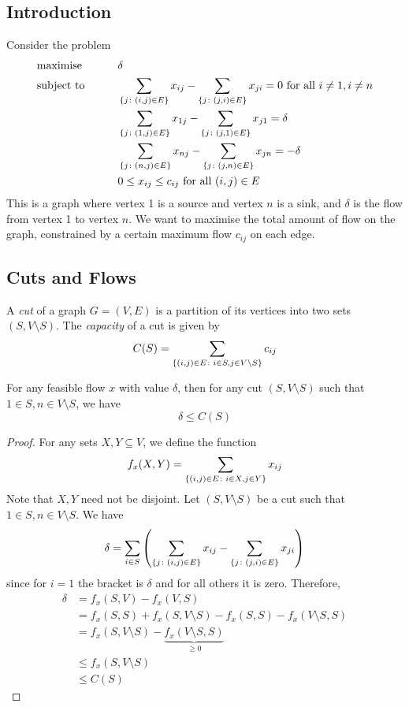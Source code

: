 \subsection{Introduction}
Consider the problem
\begin{alignat*}{2}
    & \text{maximise} & \qquad & \delta     \\
    & \text{subject to}                             &  & \sum_{\qty{j \colon (i,j) \in E}} x_{ij} - \sum_{\qty{j \colon (j,i) \in E}} x_{ji} = 0 \text{ for all } i \neq 1, i \neq n \\
    &                                               &        & \sum_{\qty{j \colon (1,j) \in E}} x_{1j} - \sum_{\qty{j \colon (j,1) \in E}} x_{j1} = \delta \\
    &&& \sum_{\qty{j \colon (n,j) \in E}} x_{nj} - \sum_{\qty{j \colon (j,n) \in E}} x_{jn} = -\delta \\
    &&& 0 \leq x_{ij} \leq c_{ij} \text{ for all } (i,j) \in E
\end{alignat*}
This is a graph where vertex 1 is a source and vertex \( n \) is a sink, and \( \delta \) is the flow from vertex 1 to vertex \( n \).
We want to maximise the total amount of flow on the graph, constrained by a certain maximum flow \( c_{ij} \) on each edge.

\subsection{Cuts and Flows}
\begin{definition}
    A \textit{cut} of a graph \( G = (V, E) \) is a partition of its vertices into two sets \( (S, V \setminus S) \).
    The \textit{capacity} of a cut is given by
    \[ C(S) = \sum_{\qty{(i,j) \in E \colon i \in S, j \in V \setminus S}} c_{ij} \]
\end{definition}
\begin{theorem}
    For any feasible flow \( x \) with value \( \delta \), then for any cut \( (S, V \setminus S) \) such that \( 1 \in S, n \in V \setminus S \), we have
    \[ \delta \leq C(S) \]
\end{theorem}
\begin{proof}
    For any sets \( X, Y \subseteq V \), we define the function
    \[ f_x(X, Y) = \sum_{\qty{(i,j) \in E \colon i \in X, j \in Y}} x_{ij} \]
    Note that \( X, Y \) need not be disjoint.
    Let \( (S, V \setminus S) \) be a cut such that \( 1 \in S, n \in V \setminus S \).
    We have
    \[ \delta = \sum_{i \in S} \qty( \sum_{\qty{j \colon (i,j) \in E}} x_{ij} - \sum_{\qty{j \colon (j,i) \in E}} x_{ji} ) \]
    since for \( i = 1 \) the bracket is \( \delta \) and for all others it is zero.
    Therefore,
    \begin{align*}
        \delta &= f_x(S, V) - f_x(V, S) \\
        &= f_x(S, S) + f_x(S, V \setminus S) - f_x(S, S) - f_x(V \setminus S, S) \\
        &= f_x(S, V \setminus S) - \underbrace{f_x(V \setminus S, S)}_{\geq 0} \\
        &\leq f_x(S, V \setminus S) \\
        &\leq C(S)
    \end{align*}
\end{proof}

